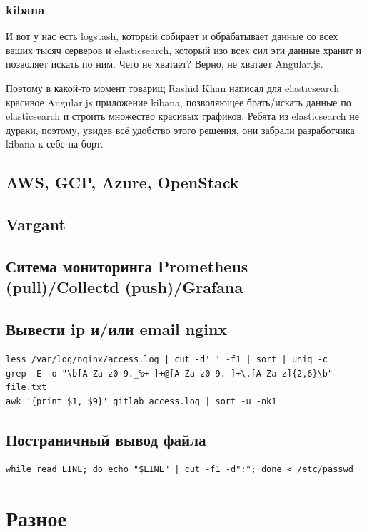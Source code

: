 \subsection{kibana}
И вот у нас есть logstash, который собирает и обрабатывает данные со всех ваших тысяч серверов и elasticsearch, который изо всех сил эти данные хранит и позволяет искать по ним. Чего не хватает? Верно, не хватает Angular.js.

Поэтому в какой-то момент товарищ Rashid Khan написал для elasticsearch красивое Angular.js приложение kibana, позволяющее брать/искать данные по elasticsearch и строить множество красивых графиков. Ребята из elasticsearch не дураки, поэтому, увидев всё удобство этого решения, они забрали разработчика kibana к себе на борт.
\section{AWS, GCP, Azure, OpenStack}
\section{Vargant}
\section{Ситема мониторинга Prometheus (pull)/Collectd (push)/Grafana}

\section{Вывести ip и/или email nginx}

\begin{lstlisting}
less /var/log/nginx/access.log | cut -d' ' -f1 | sort | uniq -c
grep -E -o "\b[A-Za-z0-9._%+-]+@[A-Za-z0-9.-]+\.[A-Za-z]{2,6}\b" file.txt
awk '{print $1, $9}' gitlab_access.log | sort -u -nk1 
\end{lstlisting}

\section{Постраничный вывод файла}
\begin{lstlisting}
while read LINE; do echo "$LINE" | cut -f1 -d":"; done < /etc/passwd
\end{lstlisting}

\chapter{Разное}

